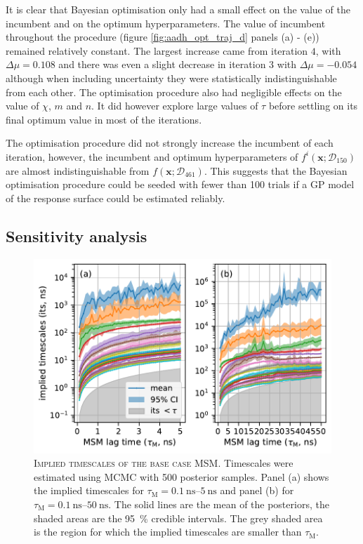 It is clear that Bayesian optimisation only had a small effect on the value of the incumbent and on the optimum hyperparameters.  The value of incumbent throughout the procedure (figure \ref{fig:aadh_opt_traj_d} panels (a) - (e)) remained relatively constant. The largest increase came from iteration $4$, with $\Delta \mu = 0.108$ and there was even a slight decrease in iteration $3$ with $\Delta \mu = -0.054$ although when including  uncertainty they were statistically indistinguishable from each other. The optimisation procedure also had negligible effects on the value of $\chi$, $m$ and $n$. It did however explore large values of  $\tau$ before settling on its final optimum value in most of the iterations.

The optimisation procedure did not strongly increase the incumbent of each iteration, however, the incumbent and optimum hyperparameters of  $f^{i}\left(\mathbf{x};\mathcal{D}_{150}\right)$ are almost indistinguishable from $f\left(\mathbf{x};\mathcal{D}_{461}\right)$. This suggests that the Bayesian optimisation procedure could be seeded with fewer than \num{100} trials if a GP model of the response surface could be estimated reliably. 

\subsection{Sensitivity analysis}\label{sec:aadh_sens_analysis}

\begin{figure}
    \centering
    \caption[Implied timescales of the base case MSM]{\textsc{Implied timescales of the base case MSM}. Timescales were estimated using MCMC with \num{500} posterior samples. Panel (a) shows the implied timescales for $\tau_{\mathrm{M}} = \SIrange[range-phrase=\text{--}]{0.1}{5}{\nano\second}$  and panel (b) for $\tau_{\mathrm{M}} = \SIrange[range-phrase=\text{--}]{0.1}{50}{\nano\second}$. The solid lines are the mean of the posteriors, the shaded areas are the  \SI{95}{\percent} credible intervals. The grey shaded area is the region for which the implied timescales are smaller than $\tau_{\mathrm{M}}$.}\label{fig:aadh_its}
    \includegraphics[width=0.8\linewidth]{chapters/msm_optimization/figures/aadh_implied_timescales.pdf}
\end{figure}

